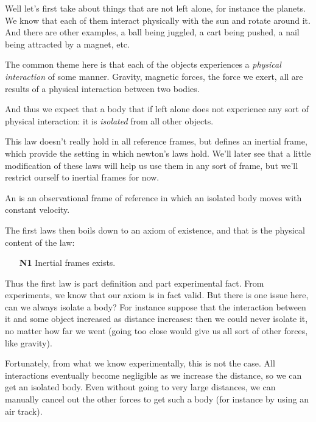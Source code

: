 Well let's first take about things that are not left alone, for instance the planets. We know that each of 
them interact physically with the sun and rotate around it. And there are other examples, a ball being 
juggled, a cart being pushed, a nail being attracted by a magnet, etc. 

The common theme here is that each 
of the objects experiences a \emph{physical interaction} of some manner. Gravity, magnetic forces, 
the force we exert, all are results of a physical interaction between two bodies. 

And thus we expect that a body that if left alone does not experience any sort of physical interaction: it 
is \emph{isolated} from all other objects. 

This law doesn't really hold in all reference frames, but defines an inertial frame, which 
provide the setting in which newton's laws hold. We'll later see that a little modification of these laws 
will help us use them in any sort of frame, but we'll restrict ourself to inertial frames for now.

\begin{definition}
    An  is an observational frame of reference in which an isolated body moves 
    with constant velocity.
\end{definition}

The first laws then boils down to an axiom of existence, and that is the physical content of the law:

\begin{enumerate}
    \item[\textbf{N1}] Inertial frames exists.
\end{enumerate}

Thus the first law is part definition and part experimental fact. From experiments, we know that our 
axiom is in fact valid. But there is one issue here, can we always isolate a body? For instance suppose 
that the interaction between it and some object increased as distance increases: then we could never 
isolate it, no matter how far we went (going too close would give us all sort of other forces, like gravity). 

Fortunately, from what we know experimentally, this is not the case. All interactions eventually become
negligible as we increase the distance, so we can get an isolated body. Even without going to very large distances, 
we can manually cancel out the other forces to get such a body (for instance by using an air track).

